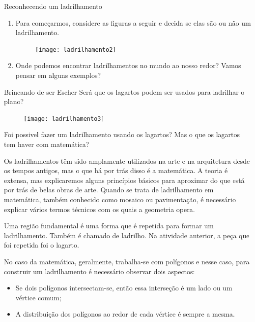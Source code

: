 \begin{task}{Reconhecendo um ladrilhamento}
\begin{enumerate}
\item Para começarmos, considere as figuras a seguir e decida se elas são ou não um ladrilhamento.

\begin{figure}[H]
\centering
\texttt{[image: ladrilhamento2]}
\end{figure}

\item Onde podemos encontrar ladrilhamentos no mundo ao nosso redor? Vamos pensar em alguns exemplos?
\end{enumerate}

\end{task}



\begin{task}{Brincando de ser Escher}
Será que os lagartos podem ser usados para ladrilhar o plano? 

\begin{figure}[H]
\centering
\texttt{[image: ladrilhamento3]}

\end{figure}
\end{task}


Foi possivel fazer um ladrilhamento usando os lagartos? Mas o que os lagartos tem haver com matemática? 

Os ladrilhamentos têm sido amplamente utilizados na arte e na arquitetura desde os tempos antigos, mas o que há por trás disso é a matemática. A teoria é extensa, mas explicaremos alguns princípios básicos para aproximar do que está por trás de belas obras de arte. Quando se trata de ladrilhamento em matemática, também conhecido como mosaico ou pavimentação, é necessário explicar vários termos técnicos com os quais a geometria opera.

Uma região fundamental é uma forma que é repetida para formar um ladrilhamento. Também é chamado de ladrilho. Na atividade anterior, a peça que foi repetida foi o lagarto.

No caso da matemática, geralmente, trabalha-se com polígonos e nesse caso, para construir um ladrilhamento é necessário observar dois aspectos: 

\begin{itemize}
\item Se dois polígonos intersectam-se, então essa interseção é um lado ou um vértice comum;
\item A distribuição dos polígonos  ao redor de cada vértice é sempre a mesma.
\end{itemize}

